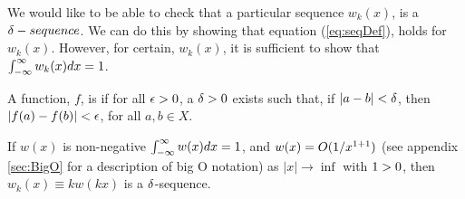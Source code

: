 We would like to be able to check that a particular sequence \(w_k(x)\), is a \(\delta-sequence\). We can do this by showing that equation (\ref{eq:seqDef}), holds for \(w_k(x)\). However, for certain, \(w_k(x)\), it is sufficient to show that \(\int_{-\infty}^{\infty} w_k(x)dx=1\).

\begin{definition}
    A function, \(f\), is  if for all \(\epsilon>0\), a \(\delta >0\) exists such that, if \(|a-b|<\delta\), then \(|f(a)-f(b)|<\epsilon\), for all \(a,b\in X\).
\end{definition}

\begin{theorem}\label{th:assertion}
    If \(w(x)\) is non-negative \(\int_{-\infty}^{\infty} w(x) dx = 1\), and \(w(x)=O(1/x^{1+1})\) (see appendix \ref{sec:BigO} for a description of big O notation) as \(|x| \rightarrow \inf\) with \(1>0\), then \( w_k(x) \equiv kw(kx)\) is a \(\delta\)-sequence.
\end{theorem}
